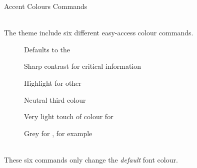 \documentclass[aspectratio=169,12pt]{beamer}
\begin{document}
\begin{frame}{Accent Colours Commands }

  \\
  The  theme include \alert{six} different easy-access colour commands.

  \medskip
  \begin{description}
  \item[] Defaults to the 
  \item[] Sharp contrast for \alert{critical information}
  \item[] Highlight for other 
  \item[] Neutral third colour 
  \item[] Very light touch of colour for 
  \item[] Grey for , for example
  \end{description}

  \medskip
  \\
  These six commands only change the \emph{default} font colour.
\end{frame}
\end{document}
